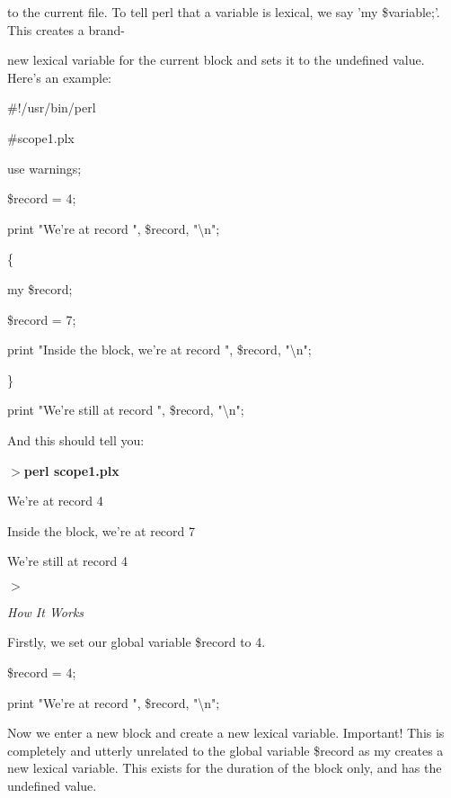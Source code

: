 \documentclass[a4paper,11pt]{book}
\begin{document}
\noindent to the current file. To tell perl that a variable is lexical, we say 'my \$variable;'. This creates a brand-

\noindent new lexical variable for the current block and sets it to the undefined value. Here's an example:

\noindent 

\noindent 

\noindent \#!/usr/bin/perl

\noindent \#scope1.plx

\noindent use warnings;

\noindent \$record = 4;

\noindent print "We're at record ", \$record, "\textbackslash n";

\noindent 

\noindent \{

\noindent my \$record;

\noindent \$record = 7;

\noindent print "Inside the block, we're at record ", \$record, "\textbackslash n";

\noindent \}

\noindent 

\noindent print "We're still at record ", \$record, "\textbackslash n";

\noindent 

\noindent And this should tell you:

\noindent 

\noindent $>$\textbf{perl scope1.plx}

\noindent We're at record 4

\noindent Inside the block, we're at record 7

\noindent We're still at record 4

\noindent $>$

\noindent 

\noindent 

\noindent \textit{How It Works}

\noindent Firstly, we set our global variable \$record to 4.

\noindent 

\noindent 

\noindent \$record = 4;

\noindent print "We're at record ", \$record, "\textbackslash n";

\noindent 

\noindent Now we enter a new block and create a new lexical variable. Important! This is completely and utterly unrelated to the global variable \$record as my creates a new lexical variable. This exists for the duration of the block only, and has the undefined value.
\end{document}

